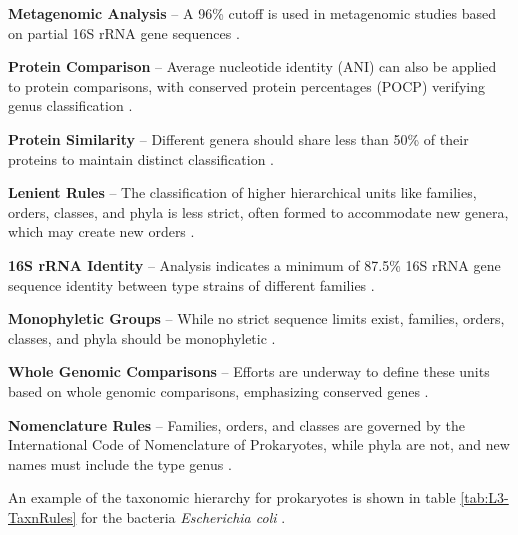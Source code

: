\textbf{Metagenomic Analysis} – A 96\% cutoff is used in metagenomic studies based on partial 16S rRNA gene sequences \cite*{L3-SeqBasedClass}.

\textbf{Protein Comparison} – Average nucleotide identity (ANI) can also be applied to protein comparisons, with conserved protein percentages (POCP) verifying genus classification \cite*{L3-SeqBasedClass}.

\textbf{Protein Similarity} – Different genera should share less than 50\% of their proteins to maintain distinct classification \cite*{L3-SeqBasedClass}.

\textbf{Lenient Rules} – The classification of higher hierarchical units like families, orders, classes, and phyla is less strict, often formed to accommodate new genera, which may create new orders \cite*{L3-SeqBasedClass}.

\textbf{16S rRNA Identity} – Analysis indicates a minimum of 87.5\% 16S rRNA gene sequence identity between type strains of different families \cite*{L3-SeqBasedClass}.

\textbf{Monophyletic Groups} – While no strict sequence limits exist, families, orders, classes, and phyla should be monophyletic \cite*{L3-SeqBasedClass}.

\textbf{Whole Genomic Comparisons} – Efforts are underway to define these units based on whole genomic comparisons, emphasizing conserved genes \cite*{L3-SeqBasedClass}.

\textbf{Nomenclature Rules} – Families, orders, and classes are governed by the International Code of Nomenclature of Prokaryotes, while phyla are not, and new names must include the type genus \cite*{L3-SeqBasedClass}.

\vspace*{0.5em}
An example of the taxonomic hierarchy for prokaryotes is shown in table \ref*{tab:L3-TaxnRules} for the bacteria \textit{Escherichia coli} \cite*{L3-SeqBasedClass}.

